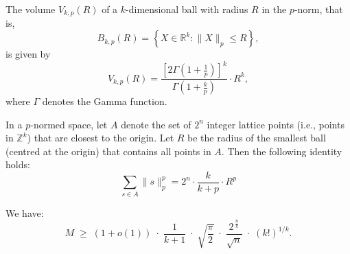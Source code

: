 \documentclass[10pt,a4paper]{amsart}
\begin{document}
   \begin{proposition}\label{thm:pnorm-volume}
   The volume $V_{k,p}(R)$ of a $k$-dimensional ball with radius $R$ in the $p$-norm, that is,
   \[
   B_{k,p}(R) = \left\{ X \in \mathbb{R}^k : \|X\|_p \leq R \right\},
   \]
   is given by
   \[
   V_{k,p}(R) = \frac{\left[2\Gamma\left(1+\frac{1}{p}\right)\right]^k}{\Gamma\left(1+\frac{k}{p}\right)} \cdot R^k,
   \]
   where $\Gamma$ denotes the Gamma function.
   \end{proposition}

   \begin{lemma}\label{lem:pnorm}
   In a $p$-normed space, let $A$ denote the set of $2^n$ integer lattice points (i.e., points in $\mathbb{Z}^k$) that are closest to the origin. Let $R$ be the radius of the smallest ball (centred at the origin) that contains all points in $A$. Then the following identity holds:
   \[
   \sum_{s\in A}{\|s\|_p^p}=2^n\cdot \frac{k}{k+p}\cdot R^p
   \]
   \end{lemma}

\begin{theorem}\label{thm:first}
We have:
\[
M \;\ge\; (1+o(1))\;\cdot\;\frac{1}{k+1}\;\cdot\;\sqrt{\frac{\pi}{2}}\;\cdot\;\frac{2^{\,\tfrac{n}{k}}}{\sqrt{n}}\;\cdot\;(k!)^{1/k}.
\]
\end{theorem}
\end{document}
